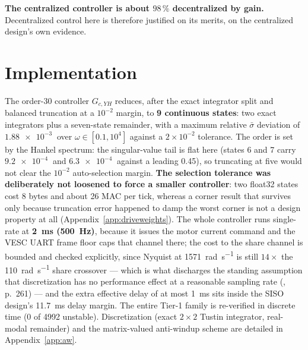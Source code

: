 \documentclass[energies,article,submit,pdftex,oneauthor]{Definitions/mdpi}
\begin{document}
\textbf{The centralized controller is about $98\,\%$ decentralized by gain.} Decentralized
control here is therefore justified on its merits, on the centralized design's
own evidence.

\section{Implementation}
\label{sec:implementation}

The order-30 controller $G_{c,YH}$ reduces, after the exact integrator split and balanced
truncation at a $10^{-2}$ margin, to \textbf{9 continuous states}: two exact integrators plus a
seven-state remainder, with a maximum relative $\bar\sigma$ deviation of $\SI{1.88e-3}{}$ over
$\omega\in[0.1,10^4]$ against a $2\times10^{-2}$ tolerance. The order is set by the Hankel
spectrum: the singular-value tail is flat here (states 6 and 7 carry
$\SI{9.2e-4}{}$ and $\SI{6.3e-4}{}$ against a leading \num{0.45}), so truncating at five would
not clear the $10^{-2}$ auto-selection margin. \textbf{The selection tolerance was deliberately
not loosened to force a smaller controller}: two float32 states cost 8 bytes and about 26 MAC
per tick, whereas a corner result that survives only because truncation error happened to damp
the worst corner is not a design property at all (Appendix~\ref{app:driveweights}). The whole
controller runs single-rate
at \textbf{\SI{2}{\milli\second} (\SI{500}{\hertz})}, because it issues the motor current command
and the VESC UART frame floor caps that channel there; the cost to the share channel is bounded
and checked explicitly, since Nyquist at \SI{1571}{\radian\per\second} is still
$14\times$ the \SI{110}{\radian\per\second} share crossover --- which is what discharges the
standing assumption that discretization has no performance effect at a reasonable sampling rate
(\citep{assadian2020neoclassical}, p.~261) --- and the extra effective delay of at
most \SI{1}{\milli\second} sits inside the SISO design's \SI{11.7}{\milli\second} delay margin.
The entire Tier-1 family is re-verified in discrete time (0 of 4992 unstable). Discretization
(exact $2\times2$ Tustin integrator, real-modal remainder) and the matrix-valued anti-windup
scheme are detailed in Appendix~\ref{app:aw}.
\end{document}
